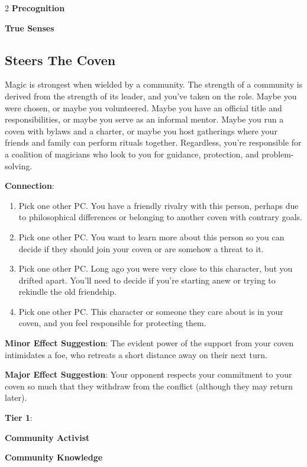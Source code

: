 \begin{multicols}{2}
\textbf{Precognition}
 
\textbf{True Senses}

\subsection{Steers The Coven}  
 
Magic is strongest when wielded by a community. The strength of a community is derived from the strength of its leader, and you’ve taken on the role. Maybe you were chosen, or maybe you volunteered. Maybe you have an official title and responsibilities, or maybe you serve as an informal mentor. Maybe you run a coven with bylaws and a charter, or maybe you host gatherings where your friends and family can perform rituals together. Regardless, you’re responsible for a coalition of magicians who look to you for guidance, protection, and problem-solving.

\textbf{Connection}: 
\begin{enumerate}
\item Pick one other PC. You have a friendly rivalry with this person, perhaps due to philosophical differences or belonging to another coven with contrary goals.
\item Pick one other PC. You want to learn more about this person so you can decide if they should join your coven or are somehow a threat to it.
\item Pick one other PC. Long ago you were very close to this character, but you drifted apart. You’ll need to decide if you’re starting anew or trying to rekindle the old friendship.
\item Pick one other PC. This character or someone they care about is in your coven, and you feel responsible for protecting them.
\end{enumerate}

\textbf{Minor Effect Suggestion}: The evident power of the support from your coven intimidates a foe, who retreats a short distance away on their next turn.

\textbf{Major Effect Suggestion}: Your opponent respects your commitment to your coven so much that they withdraw from the conflict (although they may return later).

\textbf{Tier 1}:

\textbf{Community Activist}
 
\textbf{Community Knowledge} 


\end{multicols}

